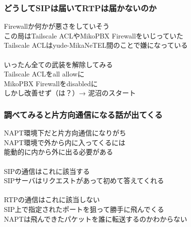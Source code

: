 \documentclass[
  lualatex,
  aspectratio=169,
  14pt
]{beamer}
\begin{document}
\begin{frame}
  \frametitle{どうしてSIPは届いてRTPは届かないのか}

  Firewallか何かが悪さをしていそう\\
  \hspace{1.5\zw}この局はTailscale ACLやMikoPBX Firewallをいじっていた\\
  \hspace{1.5\zw}Tailscale ACLはyude-MikaNeTEL間のことで嫌になっている
  \\~\\[-.5\baselineskip]

  いったん全ての武装を解除してみる\\
  \hspace{1.5\zw}Tailscale ACLをall allowに\\
  \hspace{1.5\zw}MikoPBX Firewallをdisabledに\\
  \hspace{1.5\zw}しかし改善せず（は？）→ 泥沼のスタート

  \note{ }
\end{frame}

\begin{frame}
  \frametitle{調べてみると片方向通信になる話が出てくる}

  NAPT環境下だと片方向通信になりがち\\
  \hspace{1.5\zw}NAPT環境で外から内に入ってくるには\\
  \hspace{1.5\zw}能動的に内から外に出る必要がある
  \\~\\[-.5\baselineskip]

  SIPの通信はこれに該当する\\
  \hspace{1.5\zw}SIPサーバはリクエストがあって初めて答えてくれる
  \\~\\[-.5\baselineskip]

  RTPの通信はこれに該当しない\\
  \hspace{1.5\zw}SIP上で指定されたポートを狙って勝手に飛んでくる\\
  \hspace{1.5\zw}NAPTは飛んできたパケットを誰に転送するのかわからない

  \note{ }
\end{frame}
\end{document}
